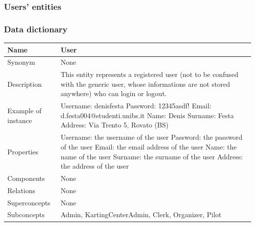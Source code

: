 \documentclass{beamer}
\begin{document}
\subsubsection{Users' entities}

\begin{frame}
    \frametitle{Data dictionary}
    \begin{table}
    \tiny
    \begin{tabular}{|p{2cm}|p{6cm}|}
    \hline
    Name & \textbf{User} \\
    \hline
    Synonym & None \\
    \hline
    Description & This entity represents a registered user
    (not to be confused with the generic user, whose informations
    are not stored anywhere) who can login or logout. \\
    \hline
    Example of instance &
    Username: denisfesta \newline
    Password: 12345asdf!  \newline
    Email: d.festa004@studenti.unibs.it \newline
    Name: Denis \newline
    Surname: Festa \newline
    Address: Via Trento 5, Rovato (BS) \\
    \hline
    Properties &
    Username: the username of the user \newline
    Password: the password of the user \newline
    Email: the email address of the user \newline
    Name: the name of the user \newline
    Surname: the surname of the user \newline
    Address: the address of the user \\
    \hline
    Components & None \\
    \hline
    Relations & None \\
    \hline
    Superconcepts & None \\
    \hline
    Subconcepts & Admin, KartingCenterAdmin, Clerk, Organizer, Pilot \\
    \hline
    \end{tabular}
    \end{table}
\end{frame}
\end{document}
